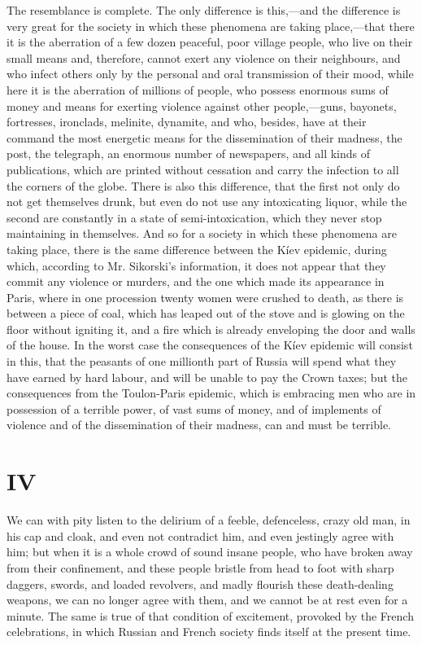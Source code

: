\documentclass{book}
\begin{document}
The resemblance is complete. The only difference is this,—and the difference is very great for the society in which these phenomena are taking place,—that there it is the aberration of a few dozen peaceful, poor village people, who live on their small means and, therefore, cannot exert any violence on their neighbours, and who infect others only by the personal and oral transmission of their mood, while here it is the aberration of millions of people, who possess enormous sums of money and means for exerting violence against other people,—guns, bayonets, fortresses, ironclads, melinite, dynamite, and who, besides, have at their command the most energetic means for the dissemination of their madness, the post, the telegraph, an enormous number of newspapers, and all kinds of publications, which are printed without cessation and carry the infection to all the corners of the globe. There is also this difference, that the first not only do not get themselves drunk, but even do not use any intoxicating liquor, while the second are constantly in a state of semi-intoxication, which they never stop maintaining in themselves. And so for a society in which these phenomena are taking place, there is the same difference between the Kíev epidemic, during which, according to Mr. Sikorski’s information, it does not appear that they commit any violence or murders, and the one which made its appearance in Paris, where in one procession twenty women were crushed to death, as there is between a piece of coal, which has leaped out of the stove and is glowing on the floor without igniting it, and a fire which is already enveloping the door and walls of the house. In the worst case the consequences of the Kíev epidemic will consist in this, that the peasants of one millionth part of Russia will spend what they have earned by hard labour, and will be unable to pay the Crown taxes; but the consequences from the Toulon-Paris epidemic, which is embracing men who are in possession of a terrible power, of vast sums of money, and of implements of violence and of the dissemination of their madness, can and must be terrible.

\chapter{IV}
\label{chapter-4}
We can with pity listen to the delirium of a feeble, defenceless, crazy old man, in his cap and cloak, and even not contradict him, and even jestingly agree with him; but when it is a whole crowd of sound insane people, who have broken away from their confinement, and these people bristle from head to foot with sharp daggers, swords, and loaded revolvers, and madly flourish these death-dealing weapons, we can no longer agree with them, and we cannot be at rest even for a minute. The same is true of that condition of excitement, provoked by the French celebrations, in which Russian and French society finds itself at the present time.
\end{document}

